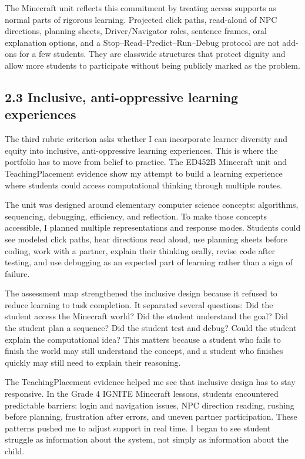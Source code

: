 \documentclass[12pt]{article}
\begin{document}
The Minecraft unit reflects this commitment by treating access supports as normal parts of rigorous learning. Projected click paths, read-aloud of NPC directions, planning sheets, Driver/Navigator roles, sentence frames, oral explanation options, and a Stop--Read--Predict--Run--Debug protocol are not add-ons for a few students. They are classwide structures that protect dignity and allow more students to participate without being publicly marked as the problem.

\subsection{2.3 Inclusive, anti-oppressive learning experiences}

The third rubric criterion asks whether I can incorporate learner diversity and equity into inclusive, anti-oppressive learning experiences. This is where the portfolio has to move from belief to practice. The ED452B Minecraft unit and TeachingPlacement evidence show my attempt to build a learning experience where students could access computational thinking through multiple routes.

The unit was designed around elementary computer science concepts: algorithms, sequencing, debugging, efficiency, and reflection. To make those concepts accessible, I planned multiple representations and response modes. Students could see modeled click paths, hear directions read aloud, use planning sheets before coding, work with a partner, explain their thinking orally, revise code after testing, and use debugging as an expected part of learning rather than a sign of failure.

The assessment map strengthened the inclusive design because it refused to reduce learning to task completion. It separated several questions: Did the student access the Minecraft world? Did the student understand the goal? Did the student plan a sequence? Did the student test and debug? Could the student explain the computational idea? This matters because a student who fails to finish the world may still understand the concept, and a student who finishes quickly may still need to explain their reasoning.

The TeachingPlacement evidence helped me see that inclusive design has to stay responsive. In the Grade 4 IGNITE Minecraft lessons, students encountered predictable barriers: login and navigation issues, NPC direction reading, rushing before planning, frustration after errors, and uneven partner participation. These patterns pushed me to adjust support in real time. I began to see student struggle as information about the system, not simply as information about the child.
\end{document}
